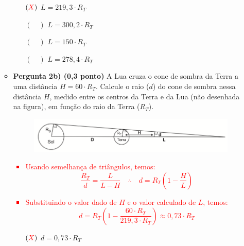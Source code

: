 \documentclass[a4paper, 12pt]{article}
\newcommand{\red}[1]{\textcolor{red}{#1}}
\begin{document}
\begin{flushleft}
\begin{itemize}
\begin{itemize}
                        \begin{itemize}
                            \item[$(\red{X})$] $L = 219,3 \cdot R_T$
                            \item[$(\quad)$] $L = 300,2 \cdot R_T$
                            \item[$(\quad)$] $L = 150 \cdot R_T$
                            \item[$(\quad)$] $L = 278,4 \cdot R_T$
                        \end{itemize}
                    \item \textbf{Pergunta 2b) (0,3 ponto)} A  Lua cruza  o  cone  de  sombra  da  Terra  a uma distância $H = 60 \cdot R_T$. Calcule o raio ($d$) do cone de sombra nessa distância $H$, medido entre os centros da Terra e da Lua (não desenhada na figura), em função do raio da Terra ($R_T$).
                        \begin{figure}[H]
                            \centering
                            \includegraphics[scale=0.5]{img/2b.png}
                        \end{figure}
                        \red{\begin{itemize}
                            \item Usando semelhança de triângulos, temos:
                                \begin{equation*}
                                    \frac{R_T}{d}=\frac{L}{L-H} \quad \therefore \quad d = R_T\left(1-\frac{H}{L}\right)
                                \end{equation*}
                            \item Substituindo o valor dado de $H$ e o valor calculado de $L$, temos:
                                \begin{equation*}
                                    d = R_T\left(1-\frac{60 \cdot R_T}{219,3 \cdot R_T}\right) \approx 0,73 \cdot R_T
                                \end{equation*}
                        \end{itemize}}
                        \begin{itemize}
                            \item[$(\red{X})$] $d = 0,73 \cdot R_T$

\end{itemize}
\end{itemize}
\end{itemize}
\end{flushleft}
\end{document}
